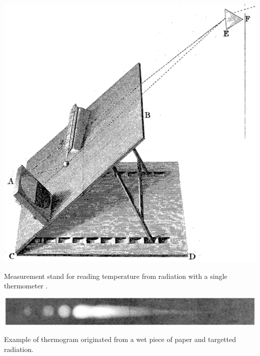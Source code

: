\newpage
\begin{marginfigure}[.15cm]
	\includegraphics{figs/fundamentals/herschel_decomposition.png}
	\caption{Measurement stand for reading temperature from radiation with a single thermometer \cite{minkina_how_2021}.}
	\label{fig:herschel_decomposition}
\end{marginfigure}
\begin{marginfigure}[7cm]
	\includegraphics{figs/fundamentals/infrared_absorption.png}
	\caption{Example of thermogram originated from a wet piece of paper and targetted radiation.}
	\label{fig:infrared_absorption}
\end{marginfigure}
